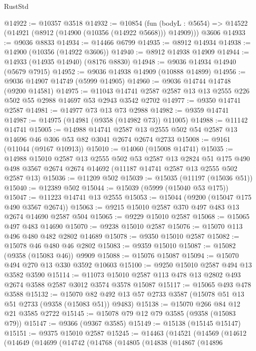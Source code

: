 \begin{lexlean}{RustStd}
\begin{coremodule}
@14922 := @10357 @3518
@14932 := @10854
    (fun (bodyL : @5654) => @14522 (@14921 (@8912 (@14900 (@10356 (@14922 @5668))) @14909)))
    @3606
@14933 := @9036 @8833
@14934 := @14466 @6799
@14935 := @8912 @14934
@14938 := @14900 (@10356 (@14922 @3606))
@14940 := @8912 @14938 @14909
@14944 := @14933 (@14935 @14940) (@8176 @8830)
@14948 := @9036 @14934 @14940 (@5679 @7915)
@14952 := @9036 @14938 @14909 (@10888 @14899)
@14956 := @9036 @14907 @14749 (@5999 @14905)
@14960 := @9036 @14744 @14748 (@9200 @14581)
@14975 := @11043 @14741 @2587 @2587 @13 @13 @2555 @226 @502 @55 @2988 @14697 @53 @2943 @3542 @2702
@14977 := @9350 @14741 @2587
@14981 := @14977 @73 @13 @73 @2988
@14982 := @9359 @14741
@14987 := @14975 (@14981 (@9358 (@14982 @73)) @11005)
@14988 := @11142 @14741
@15005 := @14988
    @14741
    @2587
    @13
    @2555
    @502
    @54
    @2587
    @13
    @14696
    @46
    @306
    @53
    @82
    @3041
    @2674
    @2674
    @2733
@15008 := @9161 (@11044 (@9167 @10913))
@15010 := @14060 (@15008 @14741)
@15035 := @14988
    @15010
    @2587
    @13
    @2555
    @502
    @53
    @2587
    @13
    @2824
    @51
    @175
    @490
    @498
    @3567
    @2674
    @2674
    @14692
    (@11187 @14741 @2587 @13 @2555 @502 @2587 @13)
@15036 := @11209 @502
@15039 := @15035 (@11197 (@15036 @51))
@15040 := @12389 @502
@15044 := @15039 (@5999 (@15040 @53 @175))
@15047 := @11223 @14741 @13 @2555
@15053 := @15044 (@9200 (@15047 @175 @490 @3567 @2674))
@15063 := @9215 @15010 @2587 @370 @497 @483 @13 @2674 @14690 @2587 @504
@15065 := @9229 @15010 @2587
@15068 := @15065 @497 @483 @14690
@15070 := @9238 @15010 @2587
@15076 := @15070 @113 @496 @480 @482 @2802 @14689
@15078 := @9350 @15010 @2587
@15082 := @15078 @46 @480 @46 @2802
@15083 := @9359 @15010
@15087 := @15082 (@9358 (@15083 @46)) @9909
@15088 := @15076 @15087
@15094 := @15070 @494 @270 @13 @330 @3592 @10603
@15100 := @9250 @15010 @2587 @494 @13 @3582 @3590
@15114 := @11073 @15010 @2587 @113 @478 @13 @2802 @493 @2674 @3588 @2587 @3012 @3574 @3578 @15087
@15117 := @15065 @493 @478 @3588
@15132 := @15070 @82 @492 @13 @57 @2733 @3587 (@15078 @51 @13 @51 @2733 (@9358 (@15083 @51)) @9483)
@15138 := @15070 @266 @84 @12 @21 @3585 @2722
@15145 := @15078 @79 @12 @79 @3585 (@9358 (@15083 @79))
@15147 := @9366 (@9367 @3585)
@15149 := @15138 (@15145 @15147)
@15151 := @9375 @15010 @2587
@15245 := @14463
    (@14521
      (@14569
        (@14612
          (@14649
            (@14699
              (@14742
                (@14768
                  (@14805
                    (@14838
                      (@14867
                        (@14896

\end{coremodule}
\end{lexlean}
